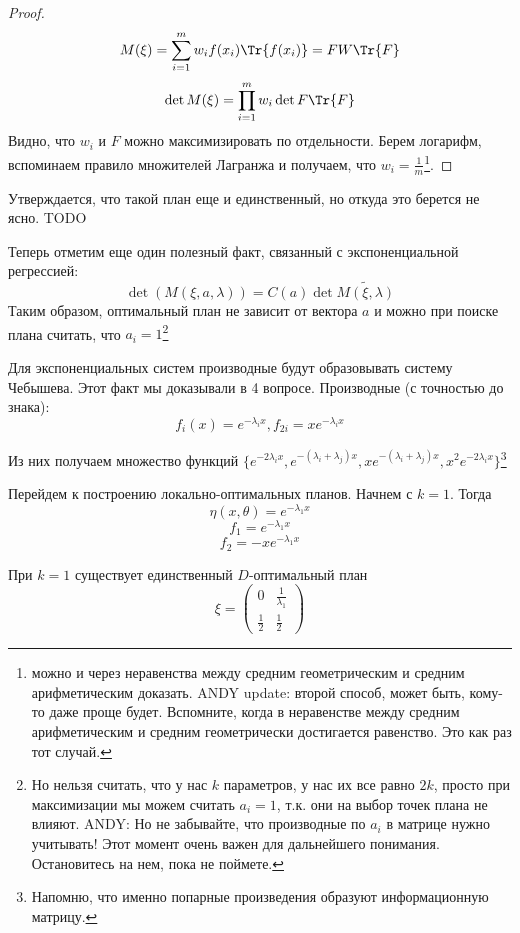 \begin{proof}
$$ M(\xi) = \sum\limits_{i=1}^{m} w_i f(x_i)\Tr{f(x_i)} = FW\Tr{F}$$
$$ \det M(\xi) = \prod\limits_{i=1}^{m}w_i \det F\Tr{F} $$
Видно, что $w_i$ и $F$ можно максимизировать по отдельности.
Берем логарифм, вспоминаем правило множителей Лагранжа и получаем, что
$w_i = \frac{1}{m}$\footnote{можно и через неравенства между средним геометрическим и средним арифметическим доказать. ANDY update: второй способ, может быть, кому-то даже проще будет. Вспомните, когда в неравенстве между средним арифметическим
и средним геометрически достигается равенство. Это как раз тот случай.}.
\end{proof}
\begin{note}
    Утверждается, что такой план еще и единственный, но откуда это берется не ясно. {\color{blue} TODO}
\end{note}

Теперь отметим еще один полезный факт, связанный с экспоненциальной регрессией:
$$ \det(M(\xi, a, \lambda)) = C(a) \det\tilde{M(\xi, \lambda)}$$
Таким образом, оптимальный план не зависит от вектора $a$ и можно при поиске плана считать, что $a_i = 1$\footnote{Но нельзя считать, что у нас $k$ параметров, у нас их все равно $2k$, просто при максимизации мы можем считать $a_i=1$, т.к. они на выбор точек плана не влияют. 
    ANDY: Но не забывайте, что производные по $a_i$ в матрице нужно учитывать! Этот момент очень важен для дальнейшего понимания. Остановитесь на нем, пока не поймете.}


Для экспоненциальных систем производные будут образовывать систему Чебышева.
Этот факт мы доказывали в 4 вопросе.
Производные (с точностью до знака):
$$f_i(x) = e^{-\lambda_ix}, f_{2i} = x e^{-\lambda_i x}$$

Из них получаем множество функций $\{e^{-2\lambda_i x}, e^{-(\lambda_i + \lambda_j) x}, xe^{-(\lambda_i + \lambda_j) x}, x^2e^{-2\lambda_i x} \}$\footnote{Напомню, что именно попарные произведения образуют информационную матрицу.}

Перейдем к построению локально-оптимальных планов. Начнем с $k=1$. Тогда
$$\eta(x, \theta) = e^{-\lambda_1x}$$
$$f_1 = e^{-\lambda_1x}$$
$$f_2 = -xe^{-\lambda_1x}$$

\begin{thm}
При $k=1$ существует единственный $D$-оптимальный план
$$ \xi = \begin{pmatrix} 0 & \frac{1}{\lambda_1} \\ \frac{1}{2} & \frac{1}{2}\end{pmatrix}$$
\end{thm}

